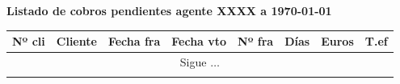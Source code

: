 \documentclass[a4paper]{article}
\begin{document}
\begin{center}
\textbf{Listado de cobros pendientes agente XXXX a {\today}}
\small
\begin{longtable}{llcccrrr}
\toprule
\textbf{Nº cli} & \textbf{Cliente}&\textbf{Fecha fra}&\textbf{Fecha vto}&\textbf{Nº fra}&\textbf{Días}&\textbf{Euros}&\textbf{T.ef}\\
\toprule
\endhead
\multicolumn{8}{c}{Sigue $\ldots$}\\
\endfoot
\endlastfoot

\bottomrule
\end{longtable}
\end{center}
\end{document}
